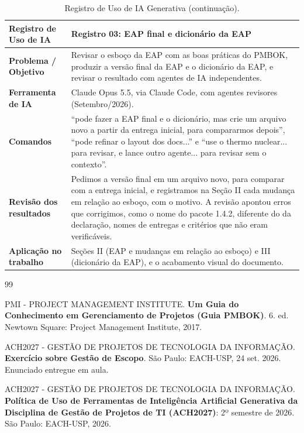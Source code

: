 \documentclass[a4paper]{article}
\begin{document}
\begin{table}[H]
    \centering
    \renewcommand{\arraystretch}{1.5}
    \small
    \begin{tabular}{|>{\raggedright\arraybackslash}p{3cm}|p{12.4cm}|}
        \hline
        \rowcolor{eapC}
        \textbf{Registro de Uso de IA} & \textbf{Registro 03: EAP final e dicionário da EAP} \\
        \hline
        \textbf{Problema / Objetivo} & Revisar o esboço da EAP com as boas práticas do PMBOK, produzir a versão final da EAP e o dicionário da EAP, e revisar o resultado com agentes de IA independentes. \\
        \hline
        \textbf{Ferramenta de IA} & Claude Opus 5.5, via Claude Code, com agentes revisores (Setembro/2026). \\
        \hline
        \textbf{Comandos} & \enquote{pode fazer a EAP final e o dicionário, mas crie um arquivo novo a partir da entrega inicial, para compararmos depois}, \enquote{pode refinar o layout dos docs...} e \enquote{use o thermo nuclear... para revisar, e lance outro agente... para revisar sem o contexto}. \\
        \hline
        \textbf{Revisão dos resultados} & Pedimos a versão final em um arquivo novo, para comparar com a entrega inicial, e registramos na Seção II cada mudança em relação ao esboço, com o motivo. A revisão apontou erros que corrigimos, como o nome do pacote 1.4.2, diferente do da declaração, nomes de entregas e critérios que não eram verificáveis. \\
        \hline
        \textbf{Aplicação no trabalho} & Seções II (EAP e mudanças em relação ao esboço) e III (dicionário da EAP), e o acabamento visual do documento. \\
        \hline
    \end{tabular}
    \caption{Registro de Uso de IA Generativa (continuação).}
    \label{tab:uso_ia_final}
\end{table}

\begin{thebibliography}{99}

PMI - PROJECT MANAGEMENT INSTITUTE. \textbf{Um Guia do Conhecimento em Gerenciamento de Projetos (Guia PMBOK)}. 6. ed. Newtown Square: Project Management Institute, 2017.

ACH2027 - GESTÃO DE PROJETOS DE TECNOLOGIA DA INFORMAÇÃO. \textbf{Exercício sobre Gestão de Escopo}. São Paulo: EACH-USP, 24 set. 2026. Enunciado entregue em aula.

ACH2027 - GESTÃO DE PROJETOS DE TECNOLOGIA DA INFORMAÇÃO. \textbf{Política de Uso de Ferramentas de Inteligência Artificial Generativa da Disciplina de Gestão de Projetos de TI (ACH2027)}: 2º semestre de 2026. São Paulo: EACH-USP, 2026.

\end{thebibliography}
\end{document}
